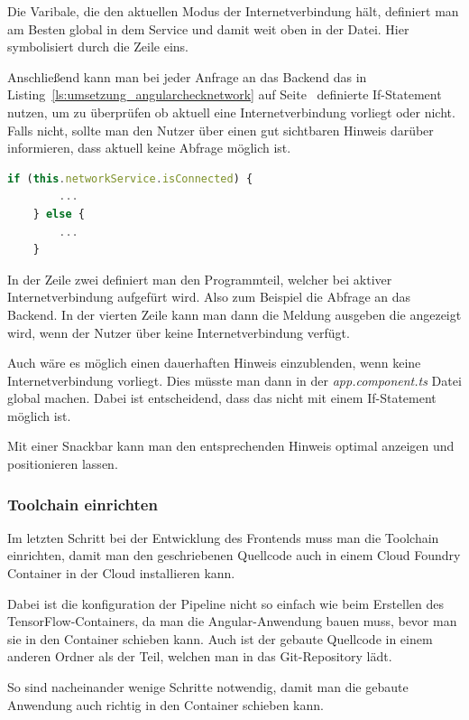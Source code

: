 Die Varibale, die den aktuellen Modus der Internetverbindung hält, definiert man am Besten global in dem Service und
damit weit oben in der Datei. Hier symbolisiert durch die Zeile eins.

Anschließend kann man bei jeder Anfrage an das Backend das in Listing~\ref{ls:umsetzung_angularchecknetwork} auf
Seite~\pageref{ls:umsetzung_angularchecknetwork} definierte If-Statement nutzen, um zu überprüfen ob aktuell eine
Internetverbindung vorliegt oder nicht. Falls nicht, sollte man den Nutzer über einen gut sichtbaren Hinweis darüber
informieren, dass aktuell keine Abfrage möglich ist.

\begin{lstlisting}[language=JavaScript, caption=Überprüfung ob eine Internetverbindung vorliegt, label=ls:umsetzung_angularchecknetwork]
    if (this.networkService.isConnected) {
        ...
    } else {
        ...
    }
\end{lstlisting}

In der Zeile zwei definiert man den Programmteil, welcher bei aktiver Internetverbindung aufgefürt wird. Also zum
Beispiel die Abfrage an das Backend. In der vierten Zeile kann man dann die Meldung ausgeben die angezeigt wird, wenn
der Nutzer über keine Internetverbindung verfügt.

Auch wäre es möglich einen dauerhaften Hinweis einzublenden, wenn keine Internetverbindung vorliegt. Dies müsste man dann
in der \textit{app.component.ts} Datei global machen. Dabei ist entscheidend, dass das nicht mit einem If-Statement
möglich ist.

Mit einer Snackbar kann man den entsprechenden Hinweis optimal anzeigen und positionieren lassen.

\subsubsection{Toolchain einrichten}
Im letzten Schritt bei der Entwicklung des Frontends muss man die Toolchain einrichten, damit man den geschriebenen
Quellcode auch in einem Cloud Foundry Container in der Cloud installieren kann.

Dabei ist die konfiguration der Pipeline nicht so einfach wie beim Erstellen des TensorFlow-Containers, da man die
Angular-Anwendung bauen muss, bevor man sie in den Container schieben kann. Auch ist der gebaute Quellcode in einem
anderen Ordner als der Teil, welchen man in das Git-Repository lädt.

So sind nacheinander wenige Schritte notwendig, damit man die gebaute Anwendung auch richtig in den Container schieben
kann.

